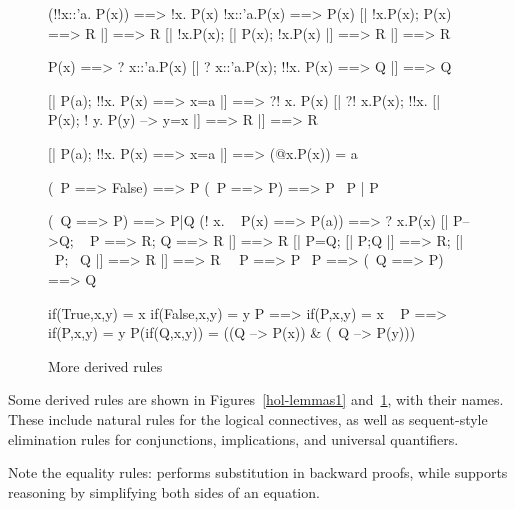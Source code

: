 \begin{figure}
\begin{ttbox}\makeatother
{}      (!!x::'a. P(x)) ==> !x. P(x)
      !x::'a.P(x) ==> P(x)
      [| !x.P(x);  P(x) ==> R |] ==> R
  [| !x.P(x);  [| P(x); !x.P(x) |] ==> R |] ==> R

       P(x) ==> ? x::'a.P(x)
       [| ? x::'a.P(x); !!x. P(x) ==> Q |] ==> Q

      [| P(a);  !!x. P(x) ==> x=a |] ==> ?! x. P(x)
      [| ?! x.P(x);  !!x. [| P(x);  ! y. P(y) --> y=x |] ==> R 
          |] ==> R

 [| P(a);  !!x. P(x) ==> x=a |] ==> (@x.P(x)) = a

          (~P ==> False) ==> P
       (~P ==> P) ==> P
 ~P | P

          (~Q ==> P) ==> P|Q
            (! x. ~ P(x) ==> P(a)) ==> ? x.P(x)
           [| P-->Q; ~ P ==> R; Q ==> R |] ==> R
           [| P=Q;  [| P;Q |] ==> R;  [| ~P; ~Q |] ==> R |] ==> R
         ~~P ==> P
            ~P ==> (~Q ==> P) ==> Q

         if(True,x,y) = x
        if(False,x,y) = y
            P ==> if(P,x,y) = x
        ~ P ==> if(P,x,y) = y
       P(if(Q,x,y)) = ((Q --> P(x)) & (~Q --> P(y)))
\end{ttbox}
\caption{More derived rules} \label{hol-lemmas2}
\end{figure}


Some derived rules are shown in Figures~\ref{hol-lemmas1}
and~\ref{hol-lemmas2}, with their {\ML} names.  These include natural rules
for the logical connectives, as well as sequent-style elimination rules for
conjunctions, implications, and universal quantifiers.  

Note the equality rules:  performs substitution in
backward proofs, while  supports reasoning by
simplifying both sides of an equation.


